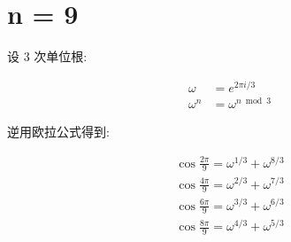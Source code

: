 \chapter{n = 9}\label{ch:cos9}

设 3 次单位根:

$$
\begin{aligned}
    ω&= e^{2πi/3}\\
    ω^n&=ω^{n\bmod 3}
\end{aligned}
$$

逆用欧拉公式得到:

$$
\begin{aligned}
    \cos\frac{2π}{9}=ω^{1/3}+ω^{8/3}\\
    \cos\frac{4π}{9}=ω^{2/3}+ω^{7/3}\\
    \cos\frac{6π}{9}=ω^{3/3}+ω^{6/3}\\
    \cos\frac{8π}{9}=ω^{4/3}+ω^{5/3}\\
\end{aligned}
$$